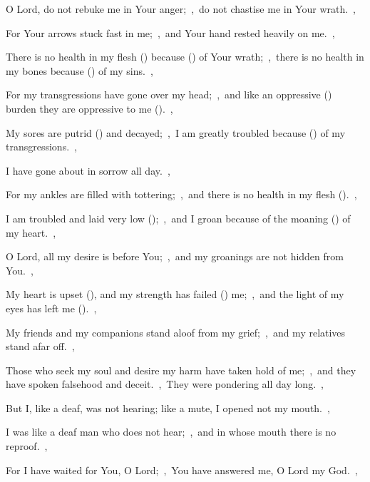 \documentclass[12pt,twoside,a5paper]{article}
\begin{document}
\begin{normalparskip}
  O Lord, do not rebuke me in Your anger;~\sep\ do not chastise me in Your wrath.~\sep


  For Your arrows stuck fast in me;~\sep\ and Your hand rested heavily on me.~\sep

  There is no health in my flesh () because () of Your wrath;~\sep\ there is no health in my bones because () of my sins.~\sep

  For my transgressions have gone over my head;~\sep\ and like an oppressive () burden they are oppressive to me ().~\sep

  My sores are putrid () and decayed;~\sep\ I am greatly troubled because () of my transgressions.~\sep

  I have gone about in sorrow all day.~\sep

  For my ankles are filled with tottering;~\sep\ and there is no health in my flesh ().~\sep

  I am troubled and laid very low ();~\sep\ and I groan because of the moaning () of my heart.~\sep

  O Lord, all my desire is before You;~\sep\ and my groanings are not hidden from You.~\sep

  My heart is upset (), and my strength has failed () me;~\sep\ and the light of my eyes has left me ().~\sep

  My friends and my companions stand aloof from my grief;~\sep\ and my relatives stand afar off.~\sep

  Those who seek my soul and desire my harm have taken hold of me;~\sep\ and they have spoken falsehood and deceit.~\sep\ They were pondering all day long.~\sep

  But I, like a deaf, was not hearing; like a mute, I opened not my mouth.~\sep

  I was like a deaf man who does not hear;~\sep\ and in whose mouth there is no reproof.~\sep

  For I have waited for You, O Lord;~\sep\ You have answered me, O Lord my God.~\sep


\end{normalparskip}
\end{document}
